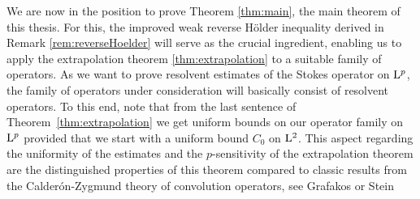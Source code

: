 We are now in the position to prove Theorem \ref{thm:main}, the main theorem of this thesis. 
For this, the improved weak reverse H\"older inequality derived in Remark \ref{rem:reverseHoelder} will serve as the crucial ingredient, enabling us to apply the extrapolation theorem \ref{thm:extrapolation} to a suitable family of operators.
As we want to prove resolvent estimates of the Stokes operator on $\mathrm{L}^p$, the family of operators under consideration will basically consist of resolvent operators.
To this end, note that from the last sentence of Theorem~\ref{thm:extrapolation} we get uniform bounds on our operator family on $\mathrm{L}^p$ provided that we start with a uniform bound $C_0$ on $\mathrm{L}^2$.
This aspect regarding the uniformity of the estimates and the $p$-sensitivity of the extrapolation theorem are the distinguished properties of this theorem compared to classic results from the Calder\'on-Zygmund theory of convolution operators, see Grafakos \cite[Sec. 5.3]{grafakos2014classical} or Stein \cite[Ch. 2]{stein}


